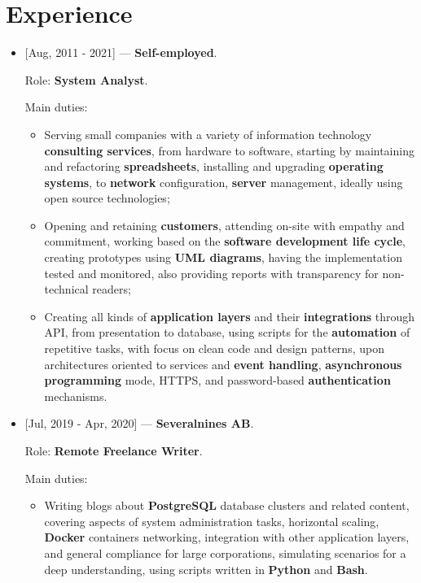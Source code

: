 \section{Experience}

\begin{itemize}
  \item {[Aug, 2011 - 2021]} --- \textbf{Self-employed}.

    Role: \textbf{System Analyst}.

    Main duties:

    \vspace{-0.5em}
    \begin{itemize}
      \item Serving small companies with a variety of information technology
        \textbf{consulting services}, from hardware to software, starting by maintaining
        and refactoring \textbf{spreadsheets}, installing and upgrading \textbf{operating
        systems}, to \textbf{network} configuration, \textbf{server} management,
        ideally using open source technologies;
      \item Opening and retaining \textbf{customers}, attending on-site with empathy and
        commitment, working based on the \textbf{software development life cycle}, creating
        prototypes using \textbf{UML diagrams}, having the implementation tested and monitored,
        also providing reports with transparency for non-technical readers;
      \item Creating all kinds of \textbf{application layers} and their \textbf{integrations}
        through API, from presentation to database, using scripts for the \textbf{automation}
        of repetitive tasks, with focus on clean code and design patterns, upon architectures
        oriented to services and \textbf{event handling}, \textbf{asynchronous programming}
        mode, HTTPS, and password-based \textbf{authentication} mechanisms.
    \end{itemize}

  \item {[Jul, 2019 - Apr, 2020]} --- \textbf{Severalnines AB}.

  Role: \textbf{Remote Freelance Writer}.

    Main duties:

    \vspace{-0.5em}
    \begin{itemize}
      \item Writing blogs about \textbf{PostgreSQL} database clusters and related content,
        covering aspects of system administration tasks, horizontal scaling,
        \textbf{Docker} containers networking, integration with other application layers,
        and general compliance for large corporations, simulating scenarios
        for a deep understanding, using scripts written in \textbf{Python} and \textbf{Bash}.
    \end{itemize}


\end{itemize}
